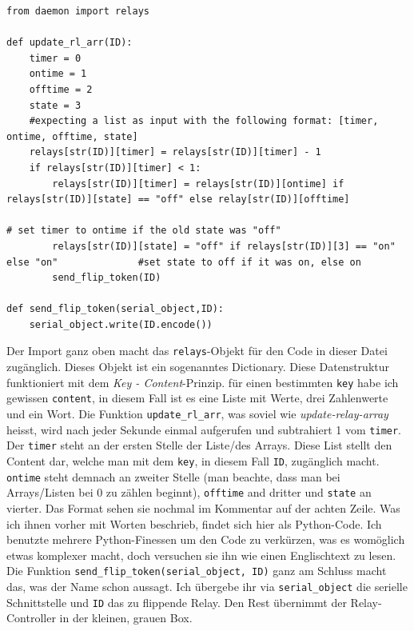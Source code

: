 \documentclass[12pt,titlepage,a4paper]{article}
\begin{document}
\begin{verbatim}
from daemon import relays

def update_rl_arr(ID):
	timer = 0
	ontime = 1
	offtime = 2
	state = 3
	#expecting a list as input with the following format: [timer, ontime, offtime, state]
	relays[str(ID)][timer] = relays[str(ID)][timer] - 1	
	if relays[str(ID)][timer] < 1:
		relays[str(ID)][timer] = relays[str(ID)][ontime] if relays[str(ID)][state] == "off" else relay[str(ID)][offtime] 
																			# set timer to ontime if the old state was "off"
		relays[str(ID)][state] = "off" if relays[str(ID)][3] == "on" else "on" 				#set state to off if it was on, else on
		send_flip_token(ID)

def send_flip_token(serial_object,ID):
	serial_object.write(ID.encode())
\end{verbatim}
Der Import ganz oben macht das \verb^relays^-Objekt für den Code in dieser Datei zugänglich. Dieses Objekt ist ein sogenanntes Dictionary. Diese Datenstruktur funktioniert mit dem \textit{Key - Content}-Prinzip. für einen bestimmten  \verb^key^ habe ich gewissen \verb^content^, in diesem Fall ist es eine Liste mit Werte, drei Zahlenwerte und ein Wort. Die Funktion  \verb^update_rl_arr^, was soviel wie \textit{update-relay-array} heisst, wird nach jeder Sekunde einmal aufgerufen und subtrahiert 1 vom  \verb^timer^. Der \verb^timer^ steht an der ersten Stelle der Liste/des Arrays. Diese List stellt den Content dar, welche man mit dem  \verb^key^, in diesem Fall  \verb^ID^, zugänglich macht.  \verb^ontime^ steht demnach an zweiter Stelle (man beachte, dass man bei Arrays/Listen bei 0 zu zählen beginnt),  \verb^offtime^ and dritter und  \verb^state^ an vierter. Das Format sehen sie nochmal im Kommentar auf der achten Zeile. Was ich ihnen vorher mit Worten beschrieb, findet sich hier als Python-Code. Ich benutzte mehrere Python-Finessen um den Code zu verkürzen, was es womöglich etwas komplexer macht, doch versuchen sie ihn wie einen Englischtext zu lesen. Die Funktion  \verb^send_flip_token(serial_object, ID)^ ganz am Schluss macht das, was der Name schon aussagt. Ich übergebe ihr via \verb^serial_object^ die serielle Schnittstelle und  \verb^ID^ das zu flippende Relay. Den Rest übernimmt der Relay-Controller in der kleinen, grauen Box.
\end{document}
